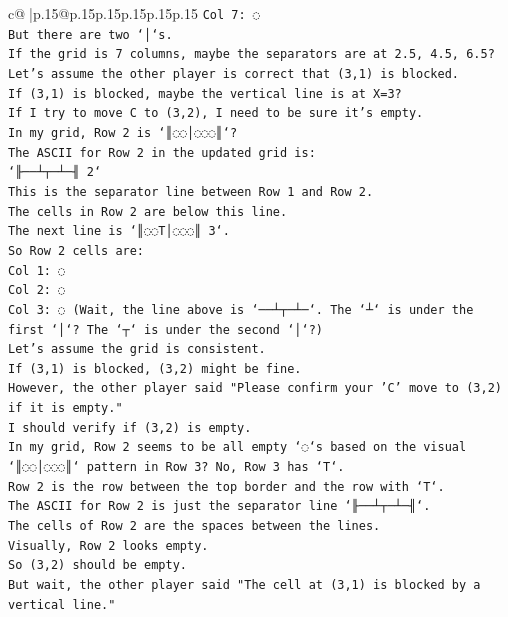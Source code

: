 \documentclass{article}
\begin{document}
{\begin{supertabular}{c@{$\;$}|p{.15\linewidth}@{}p{.15\linewidth}p{.15\linewidth}p{.15\linewidth}p{.15\linewidth}p{.15\linewidth}}
{{{\texttt{Col 7: ◌} \\
\texttt{But there are two `│`s.} \\
\texttt{If the grid is 7 columns, maybe the separators are at 2.5, 4.5, 6.5?} \\
\texttt{Let's assume the other player is correct that (3,1) is blocked.} \\
\texttt{If (3,1) is blocked, maybe the vertical line is at X=3?} \\
\texttt{If I try to move C to (3,2), I need to be sure it's empty.} \\
\texttt{In my grid, Row 2 is `║◌◌│◌◌◌║`?} \\
\texttt{The ASCII for Row 2 in the updated grid is:} \\
\texttt{`╟──┴┬─┴─╢ 2`} \\
\texttt{This is the separator line between Row 1 and Row 2.} \\
\texttt{The cells in Row 2 are below this line.} \\
\texttt{The next line is `║◌◌T│◌◌◌║ 3`.} \\
\texttt{So Row 2 cells are:} \\
\texttt{Col 1: ◌} \\
\texttt{Col 2: ◌} \\
\texttt{Col 3: ◌ (Wait, the line above is `──┴┬─┴─`. The `┴` is under the first `│`? The `┬` is under the second `│`?)} \\
\texttt{Let's assume the grid is consistent.} \\
\texttt{If (3,1) is blocked, (3,2) might be fine.} \\
\texttt{However, the other player said "Please confirm your 'C' move to (3,2) if it is empty."} \\
\texttt{I should verify if (3,2) is empty.} \\
\texttt{In my grid, Row 2 seems to be all empty `◌`s based on the visual `║◌◌│◌◌◌║` pattern in Row 3? No, Row 3 has `T`.} \\
\texttt{Row 2 is the row between the top border and the row with `T`.} \\
\texttt{The ASCII for Row 2 is just the separator line `╟──┴┬─┴─╢`.} \\
\texttt{The cells of Row 2 are the spaces between the lines.} \\
\texttt{Visually, Row 2 looks empty.} \\
\texttt{So (3,2) should be empty.} \\
\texttt{But wait, the other player said "The cell at (3,1) is blocked by a vertical line."} \\
}}}
\end{supertabular}}
\end{document}
